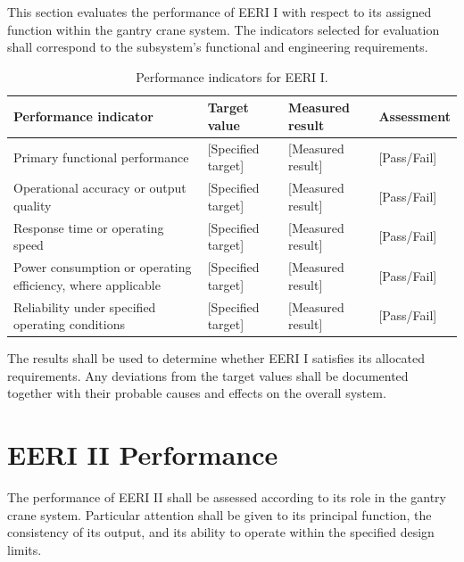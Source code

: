 This section evaluates the performance of EERI I with respect to
its assigned function within the gantry crane system. The indicators
selected for evaluation shall correspond to the subsystem's
functional and engineering requirements.

\begin{table}[H]
    \centering
    \caption{Performance indicators for EERI I.}
    \label{tab:eeri-i-performance}
    \renewcommand{\arraystretch}{1.4}
    \begin{tabularx}{\textwidth}{|X|X|X|X|}
        \hline
        \textbf{Performance indicator} &
        \textbf{Target value} &
        \textbf{Measured result} &
        \textbf{Assessment} \\
        \hline
        Primary functional performance &
        [Specified target] &
        [Measured result] &
        [Pass/Fail] \\
        \hline
        Operational accuracy or output quality &
        [Specified target] &
        [Measured result] &
        [Pass/Fail] \\
        \hline
        Response time or operating speed &
        [Specified target] &
        [Measured result] &
        [Pass/Fail] \\
        \hline
        Power consumption or operating efficiency,
        where applicable &
        [Specified target] &
        [Measured result] &
        [Pass/Fail] \\
        \hline
        Reliability under specified operating conditions &
        [Specified target] &
        [Measured result] &
        [Pass/Fail] \\
        \hline
    \end{tabularx}
\end{table}

The results shall be used to determine whether EERI I satisfies
its allocated requirements. Any deviations from the target values
shall be documented together with their probable causes and
effects on the overall system.

\section{EERI II Performance}
\label{sec:eeri-ii-performance}

The performance of EERI II shall be assessed according to its
role in the gantry crane system. Particular attention shall be
given to its principal function, the consistency of its output,
and its ability to operate within the specified design limits.

